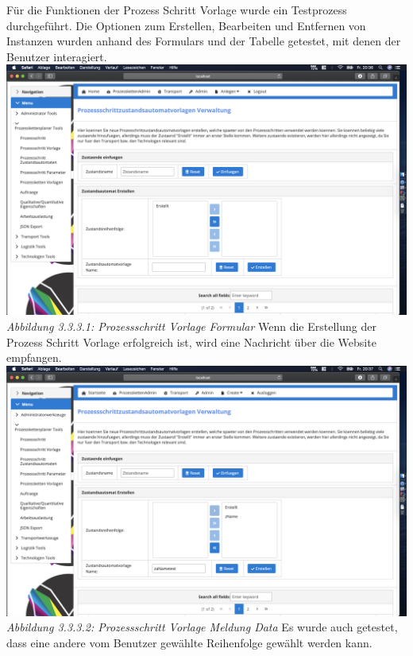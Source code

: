 \documentclass[enabledeprecatedfontcommands,fontsize=12pt,paper=a4,twoside]{scrartcl}
\begin{document}
Für die Funktionen der Prozess Schritt Vorlage wurde ein Testprozess durchgeführt. Die Optionen zum Erstellen, Bearbeiten und Entfernen von Instanzen wurden anhand des Formulars und der Tabelle getestet, mit denen der Benutzer interagiert.\\

\hypertarget{sc3.3.3.1}{
\includegraphics[width=1\textwidth]{Screenshots/333Formular.png}\\
\textit{Abbildung 3.3.3.1:  Prozessschritt Vorlage Formular}
} 
Wenn die Erstellung der Prozess Schritt Vorlage erfolgreich ist, wird eine Nachricht über die Website empfangen.\\

\hypertarget{sc3.3.3.2}{
\includegraphics[width=1\textwidth]{Screenshots/333Erzeugung.png}\\
\textit{Abbildung 3.3.3.2:  Prozessschritt Vorlage Meldung Data}
} 
Es wurde auch getestet, dass eine andere vom Benutzer gewählte Reihenfolge gewählt werden kann.\\
\end{document}
